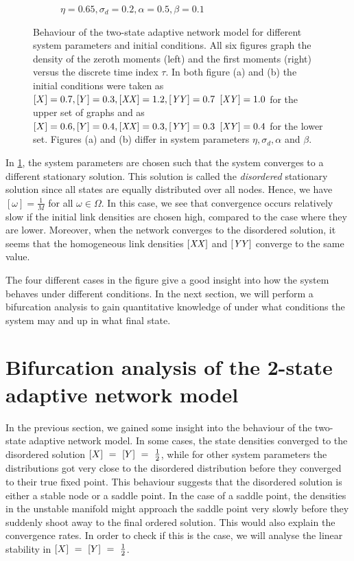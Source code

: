 \begin{figure}[htp]
\begin{subfigure}{\textwidth}
		\caption{$\eta = 0.65, \sigma_d = 0.2, \alpha = 0.5, \beta = 0.1$}
		\label{fig:typical_behaviour2}
	\end{subfigure}
	\caption{Behaviour of the two-state adaptive network model for different system parameters and initial conditions. All six figures graph the density of the zeroth moments (left) and the first moments (right) versus the discrete time index $\tau$. In both figure (a) and (b) the initial conditions were taken as $[X]=0.7, [Y]=0.3, \mathit{[XX]}=1.2, \mathit{[YY]}=0.7$ $\mathit{[XY]}=1.0$ for the upper set of graphs and as $[X]=0.6, [Y]=0.4, \mathit{[XX]}=0.3, \mathit{[YY]}=0.3$ $\mathit{[XY]}=0.4$ for the lower set. Figures (a) and (b) differ in system parameters $\eta, \sigma_d, \alpha$ and $\beta$.}
	\label{fig:typical_behaviour}
\end{figure}

In \cref{fig:typical_behaviour2}, the system parameters are chosen such that the system converges to a different stationary solution. This solution is called the \textit{disordered} stationary solution since all states are equally distributed over all nodes. Hence, we have $[\omega] = \frac{1}{M}$ for all $\omega\in\Omega$. In this case, we see that convergence occurs relatively slow if the initial link densities are chosen high, compared to the case where they are lower. Moreover, when the network converges to the disordered solution, it seems that the homogeneous link densities $\mathit{[XX]}$ and $\mathit{[YY]}$ converge to the same value.

The four different cases in the figure give a good insight into how the system behaves under different conditions. In the next section, we will perform a bifurcation analysis to gain quantitative knowledge of under what conditions the system may and up in what final state.

\section{Bifurcation analysis of the 2-state adaptive network model}

In the previous section, we gained some insight into the behaviour of the two-state adaptive network model. In some cases, the state densities converged to the disordered solution $[X]~=~[Y]~=~\frac{1}{2}$, while for other system parameters the distributions got very close to the disordered distribution before they converged to their true fixed point.  This behaviour suggests that the disordered solution is either a stable node or a saddle point. In the case of a saddle point, the densities in the unstable manifold might approach the saddle point very slowly before they suddenly shoot away to the final ordered solution. This would also explain the convergence rates. In order to check if this is the case, we will analyse the linear stability in $[X]~=~[Y]~=~\frac{1}{2}$. 

